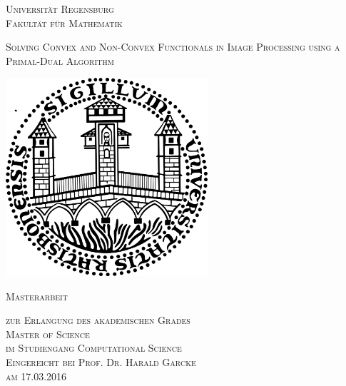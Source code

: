 \documentclass[abstracton]{scrreprt}
\begin{document}

\begin{titlepage} %
    \begin{center}
        \begin{large}
            \textsc{Universit\"at Regensburg\\
                Fakult\"at f\"ur Mathematik\\
            }
        \end{large}
        \vspace{0.5cm}
        \begin{huge}
            \begin{spacing}{0.9}
            \textsc{Solving Convex and Non-Convex Functionals in Image Processing using a Primal-Dual Algorithm}
            \end{spacing}
        \end{huge}
        \vspace{1.2cm}
        \begin{center}
        \includegraphics[width=7.5cm]{img/sigillum.png}
        \vspace{1.0cm}\\
        \begin{Large}
            \textsc{Masterarbeit}\\
        \end{Large}
        \vspace{0.5cm}
        \begin{large}
            \textsc{zur Erlangung des akademischen Grades\\
                Master of Science\\
                im Studiengang Computational Science\\
                \vspace{0.5cm}
                Eingereicht bei Prof. Dr. Harald Garcke\\
                am 17.03.2016\\
            }
        \end{large}
        \vspace{1.0cm}
    \end{center}


\end{center}
\end{titlepage}
\end{document}
